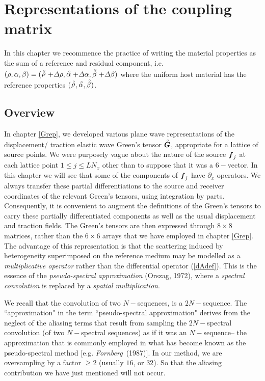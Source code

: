 \chapter{Representations of the coupling matrix}\label{Trep}
In this chapter we recommence the practice of writing the material 
properties as the sum of a reference and residual component, i.e.
$(\rho, \alpha, \beta)=(\stackrel{\scriptscriptstyle _{\,\,\circ}}{ \rho}+{\mit \Delta}\rho,\stackrel{\scriptscriptstyle _{\,\,\circ}}{ \alpha}+{\mit 
\Delta}\alpha,\stackrel{\scriptscriptstyle _{\,\,\circ}}{ \beta}+{\mit \Delta}\beta)$ where the  uniform host 
material has the reference   properties $(\stackrel{\scriptscriptstyle _{\,\,\circ}}{ \rho},\stackrel{\scriptscriptstyle _{\,\,\circ}}{ \alpha},\stackrel{\scriptscriptstyle _{\,\,\circ}}{ \beta})$.
 



\section{Overview}
In chapter \ref{Grep}, we developed various  plane wave representations of the 
displacement/ traction elastic wave Green's tensor ${\stackrel{\scriptscriptstyle _{\,\,\circ}}{ \mbox{\boldmath$\mit G$\unboldmath}}}$, 
appropriate for a lattice of source points. We were purposely vague about the nature of the 
source ${\mbox{\boldmath$\mit f$\unboldmath}}_j$ at each lattice point $1 \le j \le L N_x$ other than 
to suppose that it was a $6-$vector. 
In this chapter we will see that some of the components of ${\mbox{\boldmath$\mit f$\unboldmath}}_j$ 
have $\partial_x$ operators. We always transfer these partial 
differentiations to the source and receiver coordinates of the relevant 
Green's tensors, using integration by parts. Consequently,  it is convenient to augment 
the definitions of the Green's tensors to carry these partially 
differentiated components as well as the usual displacement and traction 
fields. The Green's tensors are then expressed through $8 \times 8 $ matrices,
rather than the $6 \times 6$ arrays that we have employed in  chapter 
\ref{Grep}. The advantage of this representation is that the scattering 
induced by heterogeneity superimposed on the reference medium may be 
modelled as a {\em multiplicative operator\/} rather than the 
differential operator (\ref{dAdef}). This is the essence of the {\em 
pseudo-spectral approximation\/} (Orszag, 1972), where a {\em spectral 
convolution\/} is replaced by a {\em spatial multiplication\/}. 

We recall that the convolution of two $N-$sequences, is a $2 N-$sequence.
The ``approximation" 
in the term ``pseudo-spectral approximation" derives from the neglect of 
the aliasing terms that result from sampling the $2N-$spectral 
convolution (of two $N-$spectral sequences) as if it was an  $N-$sequence-- 
the approximation that is commonly employed in what has become known as the pseudo-spectral 
method [e.g. {\em Fornberg\/}~(1987)]. In our method, we are 
oversampling by a factor $\ge 2$ (usually $16$, or $32$). So that the 
aliasing contribution we have just mentioned will not occur. 


